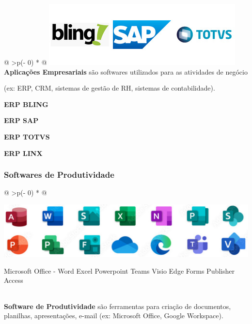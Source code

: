 \documentclass[
]{book}
\begin{document}
\begin{longtable}[]{@{}
  >{\centering\arraybackslash}p{(\columnwidth - 0\tabcolsep) * }@{}}
\toprule\noalign{}
\endhead
\bottomrule\noalign{}
\endlastfoot
\includegraphics{images/InfraEstrutura/software/erps.jpg} \\
\textbf{Aplicações Empresariais} são softwares utilizados para as atividades de negócio

(ex: ERP, CRM, sistemas de gestão de RH, sistemas de contabilidade).

\textbf{ERP BLING}

\textbf{ERP SAP}

\textbf{ERP TOTVS}

\textbf{ERP LINX} \\
\end{longtable}

\subsubsection{Softwares de Produtividade}\label{softwares-de-produtividade}

\begin{longtable}[]{@{}
  >{\centering\arraybackslash}p{(\columnwidth - 0\tabcolsep) * }@{}}
\toprule\noalign{}
\endhead
\bottomrule\noalign{}
\endlastfoot
\begin{minipage}[t]{\linewidth}\centering
\begin{center}
\includegraphics{images/InfraEstrutura/software/MS-Office.jpg}

Microsoft Office - Word Excel Powerpoint Teams Visio Edge Forms Publisher Access
\end{center}
\end{minipage} \\
\textbf{Software de Produtividade} são ferramentas para criação de documentos, planilhas, apresentações, e-mail (ex: Microsoft Office, Google Workspace). \\
\end{longtable}
\end{document}
